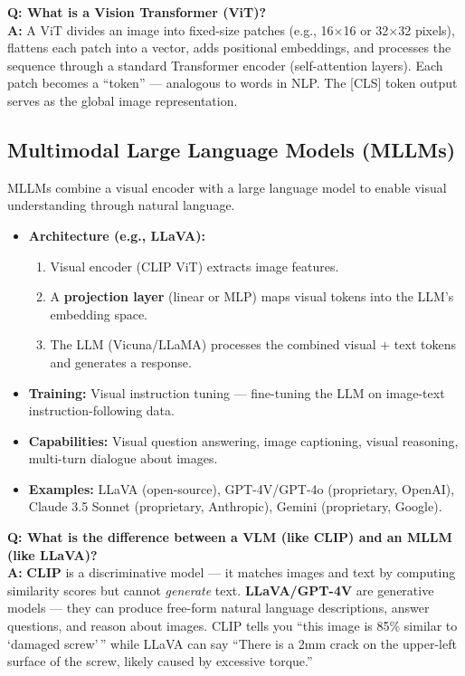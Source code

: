 \documentclass[12pt, a4paper]{article}
\begin{document}
\begin{vivaqa}
\textbf{Q: What is a Vision Transformer (ViT)?}\\[4pt]
\textbf{A:} A ViT divides an image into fixed-size patches (e.g., 16$\times$16 or 32$\times$32 pixels), flattens each patch into a vector, adds positional embeddings, and processes the sequence through a standard Transformer encoder (self-attention layers). Each patch becomes a ``token'' --- analogous to words in NLP. The [CLS] token output serves as the global image representation.
\end{vivaqa}

\subsection{Multimodal Large Language Models (MLLMs)}

MLLMs combine a visual encoder with a large language model to enable visual understanding through natural language.

\begin{itemize}[leftmargin=*]
    \item \textbf{Architecture (e.g., LLaVA):}
    \begin{enumerate}
        \item Visual encoder (CLIP ViT) extracts image features.
        \item A \textbf{projection layer} (linear or MLP) maps visual tokens into the LLM's embedding space.
        \item The LLM (Vicuna/LLaMA) processes the combined visual + text tokens and generates a response.
    \end{enumerate}
    \item \textbf{Training:} Visual instruction tuning --- fine-tuning the LLM on image-text instruction-following data.
    \item \textbf{Capabilities:} Visual question answering, image captioning, visual reasoning, multi-turn dialogue about images.
    \item \textbf{Examples:} LLaVA (open-source), GPT-4V/GPT-4o (proprietary, OpenAI), Claude 3.5 Sonnet (proprietary, Anthropic), Gemini (proprietary, Google).
\end{itemize}

\begin{vivaqa}
\textbf{Q: What is the difference between a VLM (like CLIP) and an MLLM (like LLaVA)?}\\[4pt]
\textbf{A:} \textbf{CLIP} is a discriminative model --- it matches images and text by computing similarity scores but cannot \textit{generate} text. \textbf{LLaVA/GPT-4V} are generative models --- they can produce free-form natural language descriptions, answer questions, and reason about images. CLIP tells you ``this image is 85\% similar to `damaged screw'\,'' while LLaVA can say ``There is a 2mm crack on the upper-left surface of the screw, likely caused by excessive torque.''
\end{vivaqa}
\end{document}
